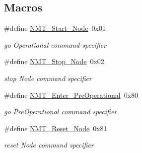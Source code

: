 \subsection*{Macros}
\begin{DoxyCompactItemize}
\item 
\mbox{\label{group___c_a_nopen___n_m_t__speficications_ga9654207fdc32413aa792c8a2dc9d414f}} 
\#define \mbox{\hyperlink{group___c_a_nopen___n_m_t__speficications_ga9654207fdc32413aa792c8a2dc9d414f}{N\+M\+T\+\_\+\+Start\+\_\+\+Node}}~0x01
\begin{DoxyCompactList}\small\item\em \textquotesingle{}go Operational\textquotesingle{} command specifier \end{DoxyCompactList}\item 
\mbox{\label{group___c_a_nopen___n_m_t__speficications_ga7aae99c67e9ebd9491a246baf92570fa}} 
\#define \mbox{\hyperlink{group___c_a_nopen___n_m_t__speficications_ga7aae99c67e9ebd9491a246baf92570fa}{N\+M\+T\+\_\+\+Stop\+\_\+\+Node}}~0x02
\begin{DoxyCompactList}\small\item\em \textquotesingle{}stop Node\textquotesingle{} command specifier \end{DoxyCompactList}\item 
\mbox{\label{group___c_a_nopen___n_m_t__speficications_gabdbbb7ecbe41058f60f684c10e07e08e}} 
\#define \mbox{\hyperlink{group___c_a_nopen___n_m_t__speficications_gabdbbb7ecbe41058f60f684c10e07e08e}{N\+M\+T\+\_\+\+Enter\+\_\+\+Pre\+Operational}}~0x80
\begin{DoxyCompactList}\small\item\em \textquotesingle{}go Pre\+Operational\textquotesingle{} command specifier \end{DoxyCompactList}\item 
\mbox{\label{group___c_a_nopen___n_m_t__speficications_gab349b5574a1ea67ff0ef76b9f9b6319e}} 
\#define \mbox{\hyperlink{group___c_a_nopen___n_m_t__speficications_gab349b5574a1ea67ff0ef76b9f9b6319e}{N\+M\+T\+\_\+\+Reset\+\_\+\+Node}}~0x81
\begin{DoxyCompactList}\small\item\em \textquotesingle{}reset Node\textquotesingle{} command specifier \end{DoxyCompactList}\item 

\end{DoxyCompactItemize}
